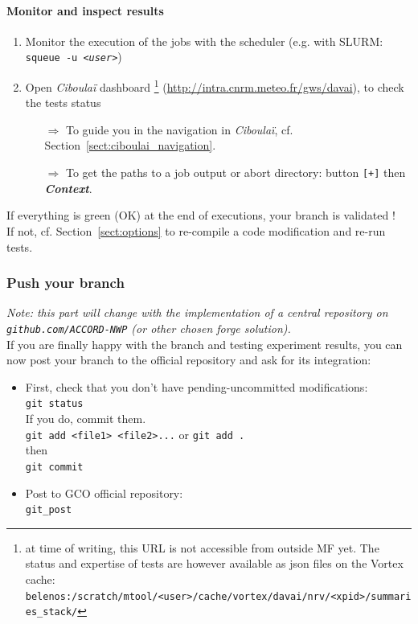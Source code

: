 \documentclass[a4paper,10pt,twoside]{article}
\begin{document}
\paragraph{Monitor and inspect results}
\begin{enumerate}[resume,label=(\alph*)]
 \item Monitor the execution of the jobs with the scheduler (e.g. with SLURM: \texttt{squeue -u \textit{<user>}})
 \item Open \textit{Ciboulaï} dashboard \footnote{at time of writing, this URL is not accessible from outside MF yet. The status and expertise of tests are however available as json files on the Vortex cache:\\
 \texttt{belenos:/scratch/mtool/<user>/cache/vortex/davai/nrv/<xpid>/summaries\_stack/}}
 (\href{http://intra.cnrm.meteo.fr/gws/davai}{http://intra.cnrm.meteo.fr/gws/davai}), to check the tests status
\begin{itemize}
 \item[$\Rightarrow$] To guide you in the navigation in \textit{Ciboulaï}, cf. Section~\ref{sect:ciboulai_navigation}.
 \item[$\Rightarrow$] To get the paths to a job output or abort directory: button \texttt{[+]} then \textit{\textbf{Context}}.
\end{itemize}
\end{enumerate}
If everything is green (OK) at the end of executions, your branch is validated !\\
If not, cf. Section~\ref{sect:options} to re-compile a code modification and re-run tests.


\subsubsection{Push your branch}
\textit{Note: this part will change with the implementation of a central repository on \texttt{github.com/ACCORD-NWP} (or other chosen forge solution).}\\
If you are finally happy with the branch and testing experiment results, you can now post your branch to the official repository and ask for its integration:
\begin{itemize}
 \item First, check that you don't have pending-uncommitted modifications:\\
 \texttt{git status}\\
 If you do, commit them.\\
 \texttt{git add <file1> <file2>...} or \texttt{git add .}\\
 then\\
 \texttt{git commit}
 \item Post to GCO official repository:\\
 \texttt{git\_post}
\end{itemize}
\end{document}
